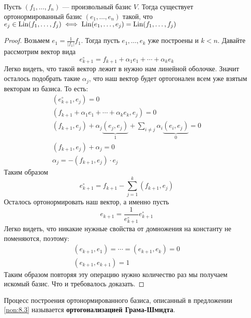 \documentclass[../main.tex]{subfiles}
\begin{document}
\begin{theorem-non}
\label{non:8.3}
  Пусть $(f_1, \dotsc, f_n)$ --- произвольный базис $V$. Тогда существует ортонормированный базис $(e_1, \dotsc, e_n)$ такой, что $e_j \in \operatorname{Lin}(f_1, \dotsc, f_j) \iff \operatorname{Lin}(e_1, \dotsc, e_j) = \operatorname{Lin}(f_1, \dotsc, f_j)$
\end{theorem-non}
\begin{proof}
  Возьмем $e_1 = \frac{1}{|f_1|} f_1$. Тогда пусть $e_1, \dotsc, e_k$ уже построены и $k < n$. Давайте рассмотрим вектор вида
  \begin{equation*}
    e_{k + 1}^{\circ} = f_{k + 1} + \alpha_1 e_1 + \dotsb + \alpha_k e_k
  \end{equation*}
  Легко видеть, что такой вектор лежит в нужно нам линейной оболочке. Значит осталось подобрать такие $\alpha_j$, что наш вектор будет ортогонален всем уже взятым векторам из базиса. То есть:
  \begin{equation*}
    \begin{gathered}
      (e_{k + 1}^{\circ}, e_j) = 0 \\
      (f_{k + 1} + \alpha_1 e_1 + \dotsb + \alpha_k e_k, e_j) = 0 \\
      (f_{k + 1}, e_j) + \alpha_j \underbrace{(e_j, e_j)}_{1} + \sum\limits_{i \neq j} \alpha_i \underbrace{(e_i, e_j)}_{0} = 0\\
      (f_{k + 1}, e_j) + \alpha_j = 0 \\
      \alpha_j = -(f_{k + 1}, e_j) \cdot e_j
    \end{gathered}
  \end{equation*}
  Таким образом
  \begin{equation*}
    e_{k + 1}^{\circ} = f_{k + 1} - \sum\limits_{j = 1}^{k} (f_{k + 1}, e_j)
  \end{equation*}
  Осталось ортонормировать наш вектор, а именно пусть
  \begin{equation*}
    e_{k + 1} = \frac{1}{e_{k + 1}^{\circ}} e_{k + 1}^{\circ}
  \end{equation*}
  Легко видеть, что никакие нужные свойства от домножения на константу не поменяются, поэтому:
  \begin{equation*}
    \begin{gathered}
      (e_{k + 1}, e_1) = \dotsb = (e_{k + 1}, e_k) = 0 \\
      (e_{k + 1}, e_{k + 1}) = 1
    \end{gathered}
  \end{equation*}
  Таким образом повторяя эту операцию нужно количество раз мы получаем искомый базис. Что и требовалось доказать.
\end{proof}

\begin{remark}
  Процесс построения ортонормированного базиса, описанный в предложении \ref{non:8.3} называется \textbf{ортогонализацией Грама-Шмидта}.
\end{remark}
\end{document}
